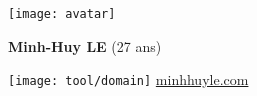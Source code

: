 \begin{minipage}{.15\textwidth}
		\texttt{[image: avatar]}
\end{minipage}
\begin{minipage}{.85\textwidth}
	\begin{minipage}{\textwidth}
		\begin{minipage}[t]{.35\textwidth}
			{
				\textbf{Minh-Huy LE} (27 ans)

			}
			\hfill
		\end{minipage}
		\begin{minipage}{.65\textwidth}
			\centering{
				\textbf{
%
				}
			}
			\hfill
		\end{minipage}
	\end{minipage}
	\begin{minipage}{\textwidth}
	
		\texttt{[image: tool/domain]}
		\href{www.minhhuyle.com}{minhhuyle.com}\hfill
	\end{minipage}
\end{minipage}

